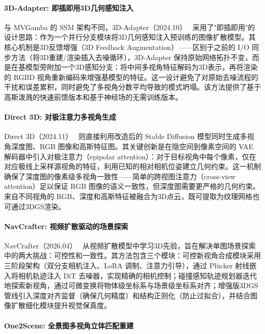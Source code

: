 \paragraph{3D-Adapter: 即插即用3D几何感知注入}

与 MVGamba 的 SSM 架构不同，3D-Adapter（2024.10）~\cite{2410_18974} 采用了"即插即用"的设计思路：作为一个并行分支模块将3D几何感知注入预训练的图像扩散模型。其核心机制是3D反馈增强（3D Feedback Augmentation）——区别于之前的 I/O 同步方法（将3D重建/渲染插入去噪循环），3D-Adapter 保持原始网络拓扑不变，而是在基模型旁附加一个3D感知分支：将中间多视角特征解码为3D表示，再将渲染的 RGBD 视角重新编码来增强基模型的特征。这一设计避免了对原始去噪流程的干扰和误差累积，同时避免了多视角分数平均导致的模式坍塌。该方法提供了基于高斯泼溅的快速前馈版本和基于神经场的无需训练版本。

\paragraph{Direct 3D: 对极注意力多视角生成}

Direct 3D（2024.11）~\cite{2411_10947} 则直接利用改造后的 Stable Diffusion 模型同时生成多视角深度图、RGB 图像和高斯特征图。其关键创新是在隐空间到像素空间的 VAE 解码器中引入对极注意力（epipolar attention）：对于目标视角中每个像素，仅在对应极线上采样源视角的特征，利用已知的相对相机位姿建立几何约束。这一机制确保了深度图的像素级多视角一致性——简单的跨视图注意力（cross-view attention）足以保证 RGB 图像的语义一致性，但深度图需要更严格的几何约束。来自不同视角的 RGB、深度和高斯特征被融合为3D点云，既可提取为纹理网格也可通过3DGS渲染。

\paragraph{NavCrafter: 视频扩散驱动的场景探索}

NavCrafter（2026.04）~\cite{2604_02828} 从视频扩散模型中学习3D先验，旨在解决单图场景探索中的两大挑战：可控性和一致性。其方法包含三个模块：可控新视角合成模块采用三阶段架构（双分支相机注入、LoRA 调制、注意力引导），通过 Pl\"{u}cker 射线嵌入将相机轨迹注入 DiT 去噪器，实现精确的相机控制；碰撞感知轨迹规划器迭代地探索新视角，通过可微变换将物体级坐标系与场景级坐标系对齐；增强版3DGS管线引入深度对齐监督（确保几何精度）和结构正则化（防止过拟合），并结合图像扩散细化模块提升视觉保真度。

\paragraph{One2Scene: 全景图多视角立体匹配重建}

